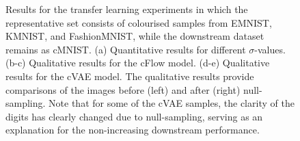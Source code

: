 \begin{figure}[htb]
{      \label{fig:cvae_tl_xd}
  }
  \caption{
    Results for the transfer learning experiments in which the representative set consists of colourised samples from EMNIST, KMNIST, and FashionMNIST, while the downstream dataset remains as cMNIST. (a) Quantitative results for different $\sigma$-values. (b-c) Qualitative results for the cFlow model.
    (d-e) Qualitative results for the cVAE model. The qualitative results provide comparisons of the images before (left) and after (right) null-sampling. Note that for some of the cVAE samples, the clarity of the digits has clearly changed due to null-sampling, serving as an explanation for the non-increasing downstream performance.
  }%
  \label{fig:cmnist-transfer-all}
  
\end{figure}


% 
% 


% 
